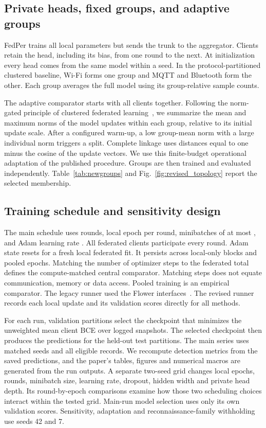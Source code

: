 \documentclass[nolineno]{ieeeaccess}
\begin{document}
\subsection{Private heads, fixed groups, and adaptive groups}
FedPer trains all local parameters but sends the trunk to the aggregator. Clients retain the head, including its bias, from one round to the next. At initialization every head comes from the same model within a seed. In the protocol-partitioned clustered baseline, Wi-Fi forms one group and MQTT and Bluetooth form the other. Each group averages the full model using its group-relative sample counts.

The adaptive comparator starts with all clients together. Following the norm-gated principle of clustered federated learning~\cite{sattler2020clustered}, we summarize the mean and maximum norms of the model updates within each group, relative to its initial update scale. After a configured warm-up, a low group-mean norm with a large individual norm triggers a split. Complete linkage uses distances equal to one minus the cosine of the update vectors. We use this finite-budget operational adaptation of the published procedure. Groups are then trained and evaluated independently. Table~\ref{tab:newgroups} and Fig.~\ref{fig:revised_topology} report the selected membership.

\RevisionTopology

\subsection{Training schedule and sensitivity design}
The main schedule uses \RevisionRounds{} rounds, \RevisionEpochs{} local epoch per round, minibatches of at most \RevisionBatch{}, and Adam learning rate \RevisionLr. All federated clients participate every round. Adam state resets for a fresh local federated fit. It persists across local-only blocks and pooled epochs. Matching the number of optimizer steps to the federated total defines the compute-matched central comparator. Matching steps does not equate communication, memory or data access. Pooled training is an empirical comparator. The legacy runner used the Flower interfaces~\cite{beutel2020flower}. The revised runner records each local update and its validation scores directly for all methods.

For each run, validation partitions select the checkpoint that minimizes the unweighted mean client BCE over logged snapshots. The selected checkpoint then produces the predictions for the held-out test partitions. The main series uses \RevisionSeeds{} matched seeds and all eligible records. We recompute detection metrics from the saved predictions, and the paper's tables, figures and numerical macros are generated from the run outputs. A separate two-seed grid changes local epochs, rounds, minibatch size, learning rate, dropout, hidden width and private head depth. Its round-by-epoch comparisons examine how those two scheduling choices interact within the tested grid. Main-run model selection uses only its own validation scores. Sensitivity, adaptation and reconnaissance-family withholding use seeds 42 and 7.
\end{document}
